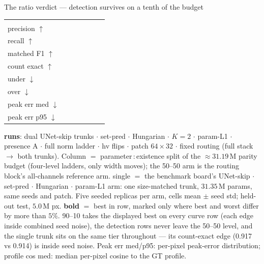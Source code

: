 \begin{frame}{The ratio verdict --- detection survives on a tenth of the budget}
\begin{tabular}{@{}l ccccc !{\hspace{7pt}} c@{}}
    \addlinespace
     \\
    precision $\uparrow$ &  &  &  &  &  &  \\
    recall $\uparrow$ &  &  &  &  &  &  \\
    matched F1 $\uparrow$ &  &  &  &  &  &  \\
    count exact $\uparrow$ &  &  &  &  &  &  \\
    \quad under $\downarrow$ &  &  &  &  &  &  \\
    \quad over $\downarrow$ &  &  &  &  &  &  \\
    peak err med $\downarrow$ &  &  &  &  &  &  \\
    peak err p95 $\downarrow$ &  &  &  &  &  &  \\
    \bottomrule
    \end{tabular}
  \par\vspace{3pt}
  \parbox{0.82\textwidth}{\tiny\color{soft} \textbf{runs}: dual UNet-skip trunks $\cdot$ set-pred $\cdot$ Hungarian $\cdot$ $K{=}2$ $\cdot$ param-L1 $\cdot$ presence A $\cdot$ full norm ladder $\cdot$ hv flips $\cdot$ patch $64{\times}32$ $\cdot$ fixed routing (full stack $\to$ both trunks). Column $=$ parameter\,:\,existence split of the ${\approx}31.19$\,M parity budget (four-level ladders, only width moves); the 50--50 arm is the routing block's all-channels reference arm. single $=$ the benchmark board's UNet-skip $\cdot$ set-pred $\cdot$ Hungarian $\cdot$ param-L1 arm: one size-matched trunk, $31.35$\,M params, same seeds and patch. Five seeded replicas per arm, cells mean $\pm$ seed std; held-out test, $5.0$\,M px. \textbf{bold} $=$ best in row, marked only where best and worst differ by more than $5\%$. 90--10 takes the displayed best on every curve row (each edge inside combined seed noise), the detection rows never leave the 50--50 level, and the single trunk sits on the same tier throughout --- its count-exact edge (0.917 vs 0.914) is inside seed noise. Peak err med/p95: per-pixel peak-error distribution; profile cos med: median per-pixel cosine to the GT profile.\par}

\end{frame}
